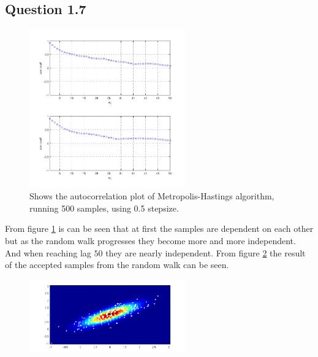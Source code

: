 \documentclass[a4paper, 10pt, final]{article}
\begin{document}

\subsection*{Question 1.7}

\begin{figure}[!htpb]
  \centering
  \includegraphics[width=0.6\textwidth]{images/q1_7a}
  \caption{Shows the autocorrelation plot of Metropolis-Hastings algorithm, running 500 samples, using 0.5 stepsize.}
  \label{fig:q1_7a}
\end{figure}

From figure \ref{fig:q1_7a} is can be seen that at first the samples
are dependent on each other but as the random walk progresses they
become more and more independent. And when reaching lag $50$ they are
nearly independent. From figure \ref{fig:q1_7b} the result of the
accepted samples from the random walk can be seen.

\begin{figure}[!htpb]
  \centering
  \includegraphics[width=0.6\textwidth]{images/q1_7b}
  \caption{}
  \label{fig:q1_7b}
\end{figure}
\end{document}
